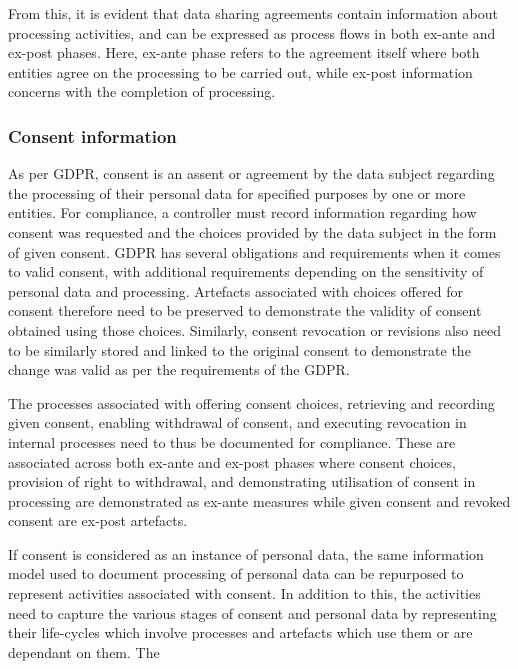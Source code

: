 From this, it is evident that data sharing agreements contain information about processing activities, and can be expressed as process flows in both ex-ante and ex-post phases. Here, ex-ante phase refers to the agreement itself where both entities agree on the processing to be carried out, while ex-post information concerns with the completion of processing.

\subsubsection{Consent information}
As per GDPR, consent is an assent or agreement by the data subject regarding the processing of their personal data for specified purposes by one or more entities. 
For compliance, a controller must record information regarding how consent was requested and the choices provided by the data subject in the form of given consent.
GDPR has several obligations and requirements when it comes to valid consent, with additional requirements depending on the sensitivity of personal data and processing. 
Artefacts associated with choices offered for consent therefore need to be preserved to demonstrate the validity of consent obtained using those choices.
Similarly, consent revocation or revisions also need to be similarly stored and linked to the original consent to demonstrate the change was valid as per the requirements of the GDPR.

The processes associated with offering consent choices, retrieving and recording given consent, enabling withdrawal of consent, and executing revocation in internal processes need to thus be documented for compliance.
These are associated across both ex-ante and ex-post phases where consent choices, provision of right to withdrawal, and demonstrating utilisation of consent in processing are demonstrated as ex-ante measures while given consent and revoked consent are ex-post artefacts. 

If consent is considered as an instance of personal data, the same information model used to document processing of personal data can be repurposed to represent activities associated with consent. In addition to this, the activities need to capture the various stages of consent and personal data by representing their life-cycles which involve processes and artefacts which use them or are dependant on them. The 

